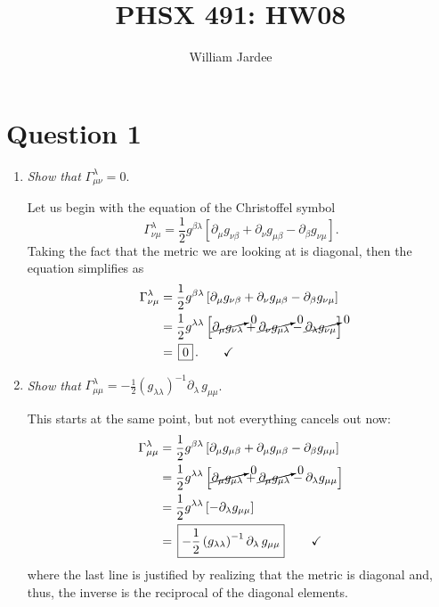 \documentclass[11pt]{article}
\begin{document}
\title{PHSX 491: HW08}
\author{William Jardee}
\maketitle

\section*{Question 1}
\begin{enumerate}[label=\alph*)]
\item \textit{Show that } $\displaystyle{\Gamma^\lambda_{\mu\nu} = 0}$.

Let us begin with the equation of the Christoffel symbol
\[\Gamma^\lambda_{\nu \mu} = \frac{1}{2}g^{\beta \lambda}\left[\partial_\mu g_{\nu \beta} + \partial_\nu g_{\mu \beta} - \partial_\beta g_{\nu\mu}\right].\]
Taking the fact that the metric we are looking at is diagonal, then the equation simplifies as
\begin{align*}
\Gamma^\lambda_{\nu \mu} &= \frac{1}{2}g^{\beta \lambda}\left[\partial_\mu g_{\nu \beta} + \partial_\nu g_{\mu \beta} - \partial_\beta g_{\nu\mu}\right]\\
& = \frac{1}{2}g^{\lambda\lambda} \left[\cancelto{0}{\partial_\mu g_{\nu \lambda}} + \cancelto{0}{\partial_\nu g_{\mu \lambda}} - \cancelto{0}{\partial_\lambda g_{\nu\mu}}\right]\\
& = \, \boxed{0} \, .  \qquad \checkmark
\end{align*}

\item \textit{Show that } $\displaystyle{\Gamma^\lambda_{\mu \mu} = -\frac{1}{2}\left(g_{\lambda\lambda}\right)^{-1}\partial_\lambda \, g_{\mu\mu}}$.

This starts at the same point, but not everything cancels out now:
\begin{align*}
\Gamma^\lambda_{\mu\mu} & = \frac{1}{2}g^{\beta \lambda} \left[\partial_\mu g_{\mu\beta} + \partial_\mu g_{\mu \beta} - \partial_\beta g_{\mu \mu}\right]\\
& = \frac{1}{2} g^{\lambda\lambda} \left[\cancelto{0}{\partial_\mu g_{\mu \lambda}} + \cancelto{0}{\partial_\mu g_{\mu \lambda}} - \partial_\lambda g_{\mu\mu}\right]\\
& = \frac{1}{2}g^{\lambda\lambda}\left[-\partial_\lambda g_{\mu\mu}\right]\\
& = \, \boxed{-\frac{1}{2}\left(g_{\lambda\lambda}\right)^{-1}\partial_\lambda \, g_{\mu\mu}} \, \qquad \checkmark
\end{align*}
where the last line is justified by realizing that the metric is diagonal and, thus, the inverse is the reciprocal of the diagonal elements.


\end{enumerate}
\end{document}
